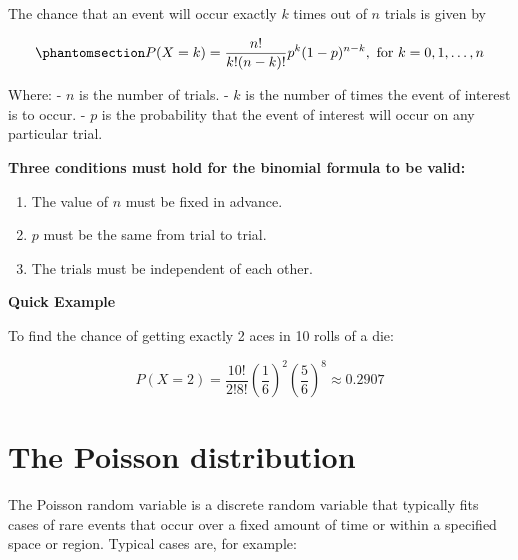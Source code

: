\documentclass[
  letterpaper,
  DIV=11,
  numbers=noendperiod]{scrreprt}
\providecommand{\tightlist}{%
  \setlength{\itemsep}{0pt}\setlength{\parskip}{0pt}}
\begin{document}
\begin{tcolorbox}[enhanced jigsaw, coltitle=black, colbacktitle=quarto-callout-important-color!10!white, left=2mm, bottomrule=.15mm, bottomtitle=1mm, colback=white, titlerule=0mm, colframe=quarto-callout-important-color-frame, breakable, leftrule=.75mm, toptitle=1mm, opacitybacktitle=0.6, rightrule=.15mm, title=\textcolor{quarto-callout-important-color}{\faExclamation}\hspace{0.5em}{The Binomial Formula}, arc=.35mm, opacityback=0, toprule=.15mm]

The chance that an event will occur exactly \(k\) times out of \(n\)
trials is given by

\begin{equation}\phantomsection\label{eq-binomial}{
P(X=k) = \frac{n!}{k!(n-k)!}p^k (1-p)^{n-k}, \text{ for } k = 0,1,\dots,n
}\end{equation}

Where: - \(n\) is the number of trials. - \(k\) is the number of times
the event of interest is to occur. - \(p\) is the probability that the
event of interest will occur on any particular trial.

\end{tcolorbox}

\textbf{Three conditions must hold for the binomial formula to be
valid:}

\begin{enumerate}
\def\labelenumi{\arabic{enumi}.}
\tightlist
\item
  The value of \(n\) must be fixed in advance.\\
\item
  \(p\) must be the same from trial to trial.\\
\item
  The trials must be independent of each other.
\end{enumerate}

\textbf{Quick Example}

To find the chance of getting exactly 2 aces in 10 rolls of a die:

\[
P(X=2) = \frac{10!}{2!8!}\left( \frac{1}{6} \right)^2 \left(\frac{5}{6} \right)^8 \approx 0.2907
\]

\section{The Poisson distribution}\label{the-poisson-distribution}

The Poisson random variable is a discrete random variable that typically
fits cases of rare events that occur over a fixed amount of time or
within a specified space or region. Typical cases are, for example:
\end{document}
